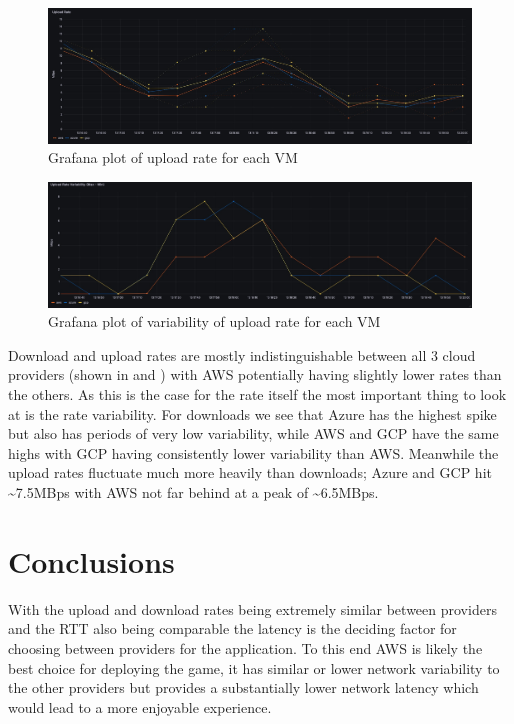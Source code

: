 \documentclass[11pt,a4paper]{article}
\begin{document}
\begin{figure}
\includegraphics[width=\textwidth]{UploadRate.jpeg}
\caption{Grafana plot of upload rate for each VM}
\label{upload}
\end{figure}

\begin{figure}
\includegraphics[width=\textwidth]{UploadRateVar.jpeg}
\caption{Grafana plot of variability of upload rate for each VM}
\label{uploadvar}
\end{figure}

Download and upload rates are mostly indistinguishable between all 3 cloud providers (shown in  and ) with AWS potentially having slightly lower rates than the others. As this is the case for the rate itself the most important thing to look at is the rate variability. For downloads we see that Azure has the highest spike but also has periods of very low variability, while AWS and GCP have the same highs with GCP having consistently lower variability than AWS. Meanwhile the upload rates fluctuate much more heavily than downloads; Azure and GCP hit \textasciitilde 7.5MBps with AWS not far behind at a peak of \textasciitilde 6.5MBps.

\section*{Conclusions}

With the upload and download rates being extremely similar between providers and the RTT also being comparable the latency is the deciding factor for choosing between providers for the application. To this end AWS is likely the best choice for deploying the game, it has similar or lower network variability to the other providers but provides a substantially lower network latency which would lead to a more enjoyable experience.
\end{document}

